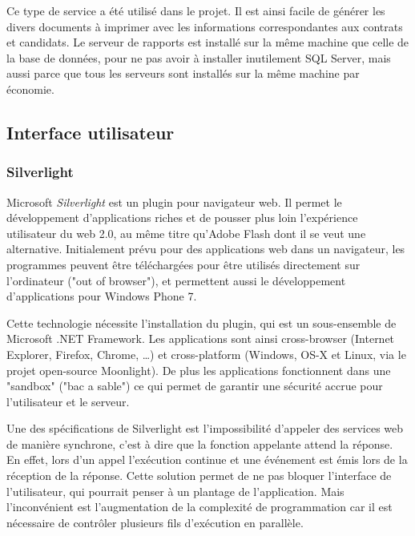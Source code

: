 Ce type de service a été utilisé dans le projet. Il est ainsi facile de générer les divers documents à imprimer avec les informations correspondantes aux contrats et candidats. Le serveur de rapports est installé sur la même machine que celle de la base de données, pour ne pas avoir à installer inutilement SQL Server, mais aussi parce que tous les serveurs sont installés sur la même machine par économie.


\subsection{Interface utilisateur}


\subsubsection{Silverlight}

Microsoft \textit{Silverlight} est un plugin pour navigateur web. Il permet le développement d'applications riches et de pousser plus loin l'expérience utilisateur du web 2.0, au même titre qu'Adobe Flash dont il se veut une alternative. Initialement prévu pour des applications web dans un navigateur, les programmes peuvent être téléchargées pour être utilisés directement sur l'ordinateur ("out of browser"), et permettent aussi le développement d'applications pour Windows Phone 7.

Cette technologie nécessite l'installation du plugin, qui est un sous-ensemble de Microsoft .NET Framework. Les applications sont ainsi cross-browser (Internet Explorer, Firefox, Chrome, \ldots) et cross-platform (Windows, OS-X et Linux, via le projet open-source Moonlight). De plus les applications fonctionnent dans une "sandbox" ("bac a sable") ce qui permet de garantir une sécurité accrue pour l'utilisateur et le serveur.

Une des spécifications de Silverlight est l'impossibilité d'appeler des services web de manière synchrone, c'est à dire que la fonction appelante attend la réponse. En effet, lors d'un appel l'exécution continue et une événement est émis lors de la réception de la réponse. Cette solution permet de ne pas bloquer l'interface de l'utilisateur, qui pourrait penser à un plantage de l'application. Mais l'inconvénient est l'augmentation de la complexité de programmation car il est nécessaire de contrôler plusieurs fils d'exécution en parallèle.

